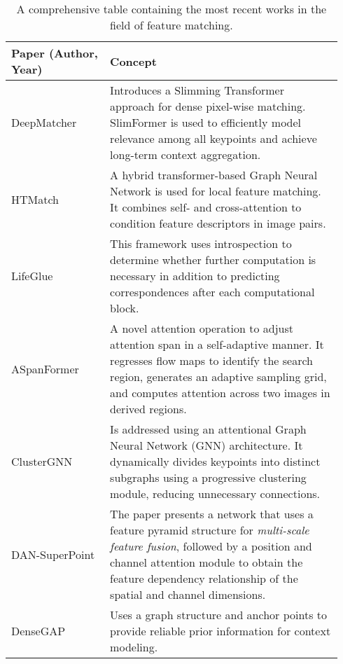 \begin{table*}[h]
    \begin{center}
    \caption{A comprehensive table containing the most recent works in the field of feature matching.}\label{tab:comp_sotas}
    \end{center}
    \centering
    \small
    \begin{tabular}{ p{0.28\linewidth}|p{0.66\linewidth}}
      \hline
     \textbf{Paper (Author, Year)} & \textbf{Concept} \\
     \hline
     \hline
    
    DeepMatcher \citep{xie2023deepmatcher} & Introduces a Slimming Transformer approach for dense pixel-wise matching. SlimFormer is used to efficiently model relevance among all keypoints and achieve long-term context aggregation. \\
    
    HTMatch \citep{cai2023htmatch} & A hybrid transformer-based Graph Neural Network is used for local feature matching. It combines self- and cross-attention to condition feature descriptors in image pairs. \\
    
    LifeGlue \citep{lindenberger2023lightglue} & This framework uses introspection to determine whether further computation is necessary in addition to predicting correspondences after each computational block. \\
    
    ASpanFormer \citep{chen2022aspanformer} & A novel attention operation to adjust attention span in a self-adaptive manner. It regresses flow maps to identify the search region, generates an adaptive sampling grid, and computes attention across two images in derived regions. \\
    
    ClusterGNN \citep{shi2022clustergnn} & Is addressed using an attentional Graph Neural Network (GNN) architecture. It dynamically divides keypoints into distinct subgraphs using a progressive clustering module, reducing unnecessary connections. \\
    
    DAN-SuperPoint \citep{li2022dan} & The paper presents a network that uses a feature pyramid structure for \emph{multi-scale feature fusion}, followed by a position and channel attention module to obtain the feature dependency relationship of the spatial and channel dimensions. \\
     
    DenseGAP \citep{kuang2022densegap} & Uses a graph structure and anchor points to provide reliable prior information for context modeling. \\
    

\end{tabular}
\end{table*}

